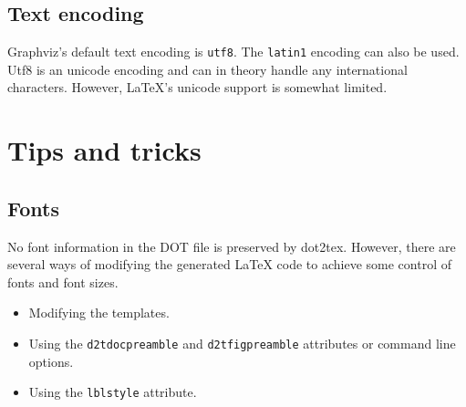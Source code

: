 \documentclass[10pt,a4paper,english]{article}
\begin{document}

\hypertarget{text-encoding}{}
\subsection*{Text encoding}
\label{text-encoding}

Graphviz's default text encoding is \texttt{utf8}. The \texttt{latin1} encoding can also be used. Utf8 is an unicode encoding and can in theory handle any international characters. However, LaTeX's unicode support is somewhat limited.



\hypertarget{tips-and-tricks}{}
\section*{Tips and tricks}
\label{tips-and-tricks}



\hypertarget{fonts}{}
\subsection*{Fonts}
\label{fonts}

No font information in the DOT file is preserved by dot2tex. However, there are several ways of  modifying the generated LaTeX code to achieve some control of fonts and font sizes.
\begin{itemize}
\item {} 
Modifying the templates.

\item {} 
Using the \texttt{d2tdocpreamble} and \texttt{d2tfigpreamble} attributes or command line options.

\item {} 
Using the \texttt{lblstyle} attribute.

\end{itemize}
\end{document}
